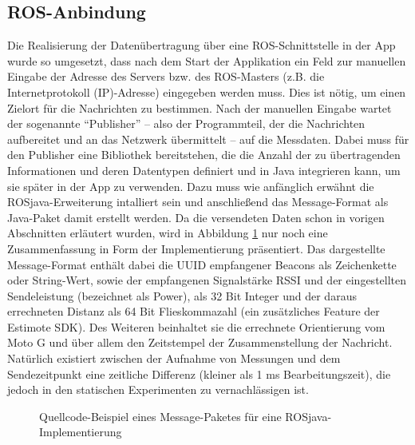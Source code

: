 \subsection{ROS-Anbindung}
Die Realisierung der Datenübertragung über eine ROS-Schnittstelle in der App wurde so umgesetzt, dass nach dem Start der Applikation ein Feld zur manuellen Eingabe der Adresse des Servers bzw. des ROS-Masters (z.B. die Internetprotokoll (IP)-Adresse) eingegeben werden muss. Dies ist nötig, um einen Zielort für die Nachrichten zu bestimmen. Nach der manuellen Eingabe wartet der sogenannte "`Publisher"' -- also der Programmteil, der die Nachrichten aufbereitet und an das Netzwerk übermittelt -- auf die Messdaten. Dabei muss für den Publisher eine Bibliothek bereitstehen, die die Anzahl der zu übertragenden Informationen und deren Datentypen definiert und in Java integrieren kann, um sie später in der App zu verwenden. Dazu muss wie anfänglich erwähnt die ROSjava-Erweiterung intalliert sein und anschließend das Message-Format als Java-Paket damit erstellt werden. Da die versendeten Daten schon in vorigen Abschnitten erläutert wurden, wird in Abbildung \ref{fig:ROSjavaImpl} nur noch eine Zusammenfassung in Form der Implementierung präsentiert. Das dargestellte Message-Format enthält dabei die UUID empfangener Beacons als Zeichenkette oder String-Wert, sowie der empfangenen Signalstärke RSSI und der eingestellten Sendeleistung (bezeichnet als Power), als 32 Bit Integer und der daraus errechneten Distanz als 64 Bit Flieskommazahl (ein zusätzliches Feature der Estimote SDK). Des Weiteren beinhaltet sie die errechnete Orientierung vom Moto G und über allem den Zeitstempel der Zusammenstellung der Nachricht. Natürlich existiert zwischen der Aufnahme von Messungen und dem Sendezeitpunkt eine zeitliche Differenz (kleiner als 1 ms Bearbeitungszeit), die jedoch in den statischen Experimenten zu vernachlässigen ist. 
\begin{figure}[H]
\centering
{}
\caption{Quellcode-Beispiel eines Message-Paketes für eine ROSjava-Implementierung}
\label{fig:ROSjavaImpl}
\end{figure}
